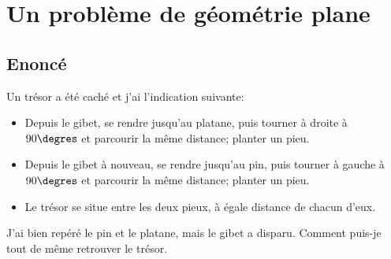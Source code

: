 \documentclass{article}
\newenvironment{statement}{\subsection{Enoncé}}{\pagebreak}
\begin{document}
\section{Un problème de géométrie plane}
\begin{statement}
Un trésor a été caché et j'ai l'indication suivante:
\begin{itemize}
\item
Depuis le gibet, se rendre jusqu'au platane, puis tourner à droite à $90\degres$ et parcourir la même distance; planter un pieu.
\item
Depuis le gibet à nouveau, se rendre jusqu'au pin, puis tourner à gauche à $90\degres$ et parcourir la même distance; planter un pieu.
\item
Le trésor se situe entre les deux pieux, à égale distance de chacun d'eux.
\end{itemize}
J'ai bien repéré le pin et le platane, mais le gibet a disparu. Comment puis-je tout de même retrouver le trésor.
\end{statement}
\end{document}
